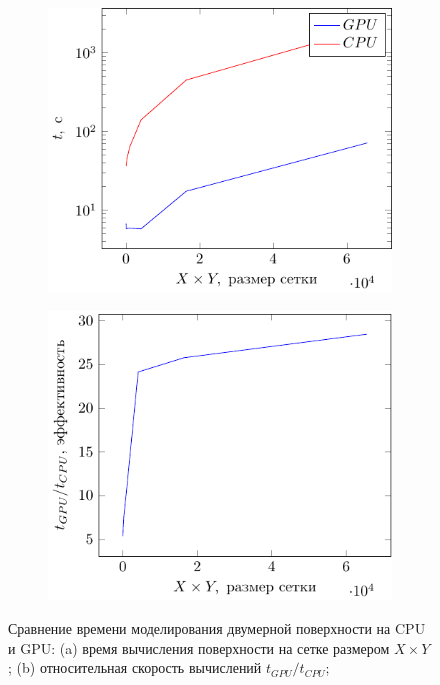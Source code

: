 \begin{figure}[H]
    \centering
    \begin{subfigure}{0.49\linewidth}
        \centering
        \includegraphics[]{fig/water/gpucpu.pdf}
    \end{subfigure}
    \begin{subfigure}{0.49\linewidth}
        \centering
        \includegraphics[]{fig/water/gpucpu1.pdf}
    \end{subfigure}
    \caption{Сравнение времени моделирования двумерной поверхности на CPU и
    GPU: (a) время вычисления поверхности на сетке размером $X \times Y$;
(b) относительная скорость вычислений $t_{GPU}/t_{CPU}$;}
    \label{fig:gpucpu}
\end{figure}

